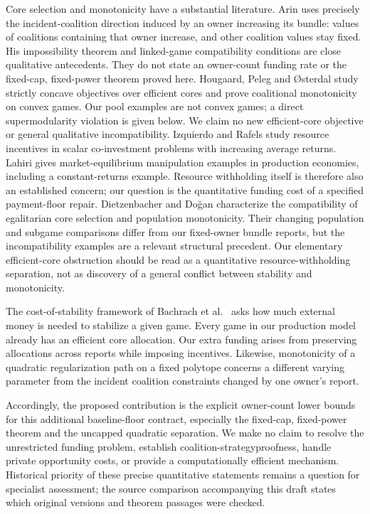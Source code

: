 \documentclass[11pt]{article}
\theoremstyle{definition}
\theoremstyle{remark}
\begin{document}
Core selection and monotonicity have a substantial literature. Arin
\cite{Arin2011} uses precisely the incident-coalition direction induced by an
owner increasing its bundle: values of coalitions containing that owner increase,
and other coalition values stay fixed. His impossibility theorem and linked-game
compatibility conditions are close qualitative antecedents. They do not state
an owner-count funding rate or the fixed-cap, fixed-power theorem proved here.
Hougaard, Peleg and \O sterdal \cite{HPO2003} study strictly concave objectives
over efficient cores and prove coalitional monotonicity on convex games. Our
pool examples are not convex games; a direct supermodularity violation is given
below. We claim no new efficient-core objective or general qualitative
incompatibility. Izquierdo and
Rafels \cite{IR2017} study resource incentives in scalar co-investment problems
with increasing average returns. Lahiri \cite{Lahiri2005} gives market-equilibrium
manipulation examples in production economies, including a constant-returns
example. Resource withholding itself is therefore also an established concern;
our question is the quantitative funding cost of a specified payment-floor repair.
Dietzenbacher and Do\u{g}an \cite{DD2025}
characterize the compatibility of egalitarian core selection and population
monotonicity. Their changing population and subgame comparisons differ from our
fixed-owner bundle reports, but the incompatibility examples are a relevant
structural precedent. Our elementary efficient-core obstruction should be read
as a quantitative resource-withholding separation, not as discovery of a general
conflict between stability and monotonicity.

The cost-of-stability framework of Bachrach et al.\ \cite{CostStability2009}
asks how much external money is needed to stabilize a given game. Every game in
our production model already has an efficient core allocation. Our extra funding
arises from preserving allocations across reports while imposing incentives.
Likewise, monotonicity of a quadratic regularization path on a fixed polytope
\cite{GNR2025} concerns a different varying parameter from the incident coalition
constraints changed by one owner's report.

Accordingly, the proposed contribution is the explicit owner-count lower bounds
for this additional baseline-floor contract, especially the fixed-cap,
fixed-power theorem and the uncapped quadratic separation. We make no claim to
resolve the unrestricted funding problem, establish coalition-strategyproofness,
handle private opportunity costs, or provide a computationally efficient mechanism.
Historical priority of these precise quantitative statements remains a question
for specialist assessment; the source comparison accompanying this draft states
which original versions and theorem passages were checked.
\end{document}
